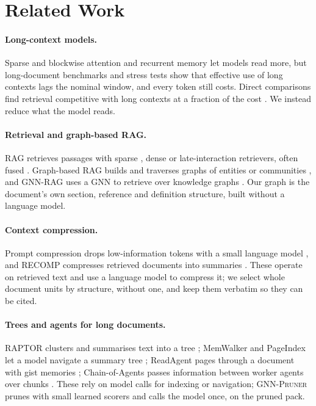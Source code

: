 \documentclass[11pt]{article}
\newcommand{\system}{\textsc{GNN-Pruner}}
\begin{document}
\section{Related Work}

\paragraph{Long-context models.} Sparse and blockwise attention \citep{beltagy2020longformer,zaheer2020bigbird,liu2024ringattention} and recurrent memory \citep{bulatov2022rmt} let models read more, but long-document benchmarks \citep{shaham2022scrolls,bai2024longbench} and stress tests \citep{liu2024lost,hsieh2024ruler,kuratov2024babilong} show that effective use of long contexts lags the nominal window, and every token still costs. Direct comparisons find retrieval competitive with long contexts at a fraction of the cost \citep{xu2024retrievallong,li2024selfroute}. We instead reduce what the model reads.

\paragraph{Retrieval and graph-based RAG.} RAG \citep{lewis2020rag,izacard2021fid,asai2024selfrag} retrieves passages with sparse \citep{robertson2009bm25}, dense \citep{karpukhin2020dpr,reimers2019sbert} or late-interaction \citep{khattab2020colbert,santhanam2022colbertv2} retrievers, often fused \citep{cormack2009rrf}. Graph-based RAG builds and traverses graphs of entities or communities \citep{edge2024graphrag,gutierrez2024hipporag,peng2024graphragsurvey}, and GNN-RAG uses a GNN to retrieve over knowledge graphs \citep{mavromatis2025gnnrag}. Our graph is the document's own section, reference and definition structure, built without a language model.

\paragraph{Context compression.} Prompt compression drops low-information tokens with a small language model \citep{jiang2023llmlingua,jiang2024longllmlingua}, and RECOMP compresses retrieved documents into summaries \citep{xu2024recomp}. These operate on retrieved text and use a language model to compress it; we select whole document units by structure, without one, and keep them verbatim so they can be cited.

\paragraph{Trees and agents for long documents.} RAPTOR clusters and summarises text into a tree \citep{sarthi2024raptor}; MemWalker and PageIndex let a model navigate a summary tree \citep{chen2023memwalker,pageindex2025}; ReadAgent pages through a document with gist memories \citep{lee2024readagent}; Chain-of-Agents passes information between worker agents over chunks \citep{zhang2024chainofagents}. These rely on model calls for indexing or navigation; \system{} prunes with small learned scorers and calls the model once, on the pruned pack.
\end{document}
